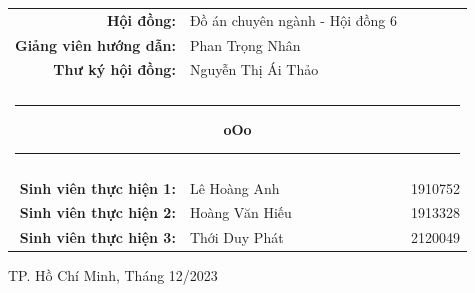 \begin{titlepage}
    \vspace{1.5cm}

    \begingroup
        \fontsize{14pt}{12pt}\selectfont
        \begin{center}
            \begin{tabular}{rll}
                \color{black} \textbf{Hội đồng:} & \color{black} Đồ án chuyên ngành - Hội đồng 6 &  \\
                \color{black} \textbf{Giảng viên hướng dẫn:} & \color{black} Phan Trọng Nhân &  \\
                \color{black} \textbf{Thư ký hội đồng:} & \color{black} Nguyễn Thị Ái Thảo &  \\
                \\

                \multicolumn{3}{c}{\noindent\rule{4cm}{0.5pt} \textbf{oOo} \noindent\rule{4cm}{0.5pt}} \\ \\
                \color{black}\textbf{Sinh viên thực hiện 1:} & \color{black}Lê Hoàng Anh & \color{black}1910752 \\
                \color{black}\textbf{Sinh viên thực hiện 2:} & \color{black}Hoàng Văn Hiếu & \color{black}1913328 \\
                \color{black}\textbf{Sinh viên thực hiện 3:} & \color{black}Thới Duy Phát & \color{black}2120049 \\
            \end{tabular}
        \end{center}
    \endgroup
    
    \vspace{1.5cm}

    \begingroup
        \fontsize{12pt}{12pt}\selectfont
        \begin{center}
            {TP. Hồ Chí Minh, Tháng 12/2023}
        \end{center}
    \endgroup
    
\end{titlepage}